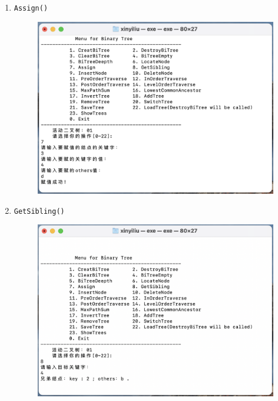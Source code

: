 \documentclass[supercite]{Experimental_Report}
\theoremstyle{definition}
\begin{document}
\begin{enumerate}
	\item \verb|Assign()|
		\begin{figure}[!htb]
			\includegraphics[width=0.8\linewidth]{images/img02/截屏2023-06-04 21.13.56.png}
		\end{figure}
		\FloatBarrier
	\newpage
	\item \verb|GetSibling()|
		\begin{figure}[!htb]
			\includegraphics[width=0.8\linewidth]{images/img02/截屏2023-06-04 21.14.08.png}
		\end{figure}
	\FloatBarrier
	

\end{enumerate}
\end{document}
